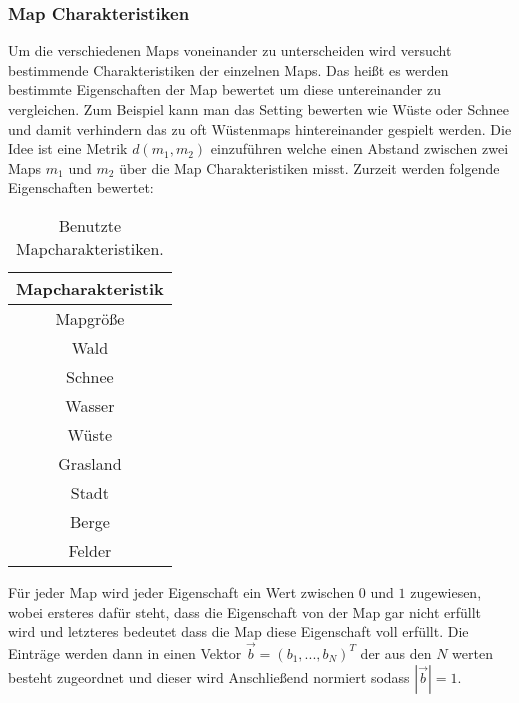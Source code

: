         \subsubsection{Map Charakteristiken}
            Um die verschiedenen Maps voneinander zu unterscheiden wird versucht bestimmende Charakteristiken der einzelnen Maps.
            Das heißt es werden bestimmte Eigenschaften der Map bewertet um diese untereinander zu vergleichen.
            Zum Beispiel kann man das \glqq{}Setting\grqq{} bewerten wie \glqq{}Wüste\grqq{} oder \glqq{}Schnee\grqq{} und damit verhindern das zu oft Wüstenmaps hintereinander gespielt werden.
            Die Idee ist eine Metrik $d(m_1,m_2)$ einzuführen welche einen \glqq{}Abstand\grqq{} zwischen zwei Maps $m_1$ und $m_2$ über die Map Charakteristiken misst.
            Zurzeit werden folgende Eigenschaften bewertet:
            \begin{table}[h]
                \centering
                \begin{tabular}{|| c ||}
                    \hline
                    \textbf{Mapcharakteristik}  \\
                    \hline
                    \hline
                    Mapgröße \\
                    \hline
                    Wald \\
                    \hline
                    Schnee \\
                    \hline
                    Wasser \\
                    \hline
                    Wüste \\
                    \hline
                    Grasland \\
                    \hline
                    Stadt \\
                    \hline
                    Berge \\
                    \hline
                    Felder \\
                    \hline
                \end{tabular}
                \caption{Benutzte Mapcharakteristiken.}
                \label{t:Aufbau:Charakteristiken}
            \end{table}
            Für jeder Map wird jeder Eigenschaft ein Wert zwischen $0$ und $1$ zugewiesen, wobei ersteres dafür steht, dass die Eigenschaft von der Map gar nicht erfüllt wird und letzteres bedeutet dass die Map diese Eigenschaft voll erfüllt.
            Die Einträge werden dann in einen Vektor $\vec{b}=(b_1,...,b_N)^T$ der aus den $N$ werten besteht zugeordnet und dieser wird Anschließend normiert sodass $|\vec{b}|=1$.
